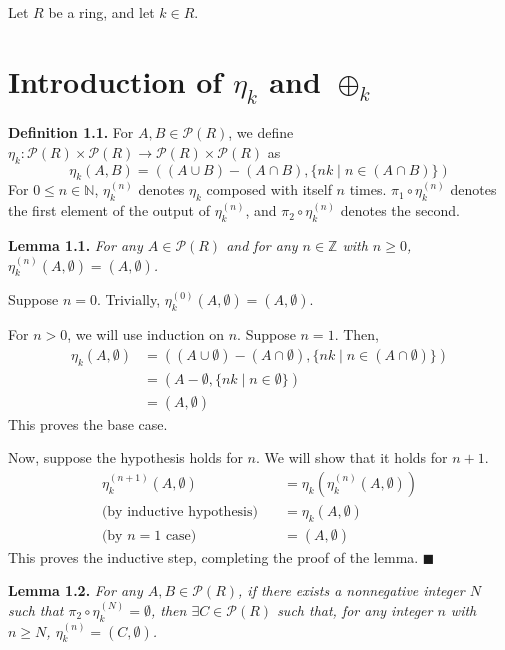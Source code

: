 \documentclass{article}
\newcommand{\zee}{\mathbb{Z}}
\newcommand{\N}{\mathbb{N}}
\begin{document}
Let $R$ be a ring, and let $k \in R$.

\section{Introduction of $\eta_k$ and $\oplus_k$}

\textbf{Definition 1.1.} For $A, B \in \mathcal{P}(R)$, we define
$\eta_k: \mathcal{P}(R) \times \mathcal{P}(R)
\rightarrow \mathcal{P}(R) \times \mathcal{P}(R)$ as
\[\eta_k(A, B) = ((A \cup B) - (A \cap B), \{nk \mid n \in (A \cap B)\})\]
For $0 \leq n \in \N$, $\eta_k^{(n)}$ denotes $\eta_k$ composed
with itself $n$ times. $\pi_1 \circ \eta_k^{(n)}$ denotes the first
element of the output of $\eta_k^{(n)}$, and $\pi_2 \circ \eta_k^{(n)}$
denotes the second.

\textbf{Lemma 1.1.} \textit{
    For any $A \in \mathcal{P}(R)$ and for any $n \in \zee$
    with $n \geq 0$,
    $\eta_k^{(n)}(A, \emptyset) = (A, \emptyset)$.
}

Suppose $n = 0$. Trivially,
$\eta_k^{(0)}(A, \emptyset) = (A, \emptyset)$.

For $n > 0$, we will use induction on $n$.
Suppose $n = 1$. Then,
\[\begin{split}
    \eta_k(A, \emptyset)
    &= ((A \cup \emptyset) - (A \cap \emptyset),
    \{nk \mid n \in (A \cap \emptyset)\}) \\
    &= (A - \emptyset, \{nk \mid n \in \emptyset\}) \\
    &= (A, \emptyset)
\end{split}\]
This proves the base case.

Now, suppose the hypothesis holds
for $n$. We will show that it holds for $n+1$.
\[\begin{split}
    \eta_k^{(n+1)}(A, \emptyset)
    &= \eta_k(\eta_k^{(n)}(A, \emptyset)) \\
    \text{(by inductive hypothesis)}\quad
    &= \eta_k(A, \emptyset) \\
    \text{(by $n=1$ case)}\quad
    &= (A, \emptyset)
\end{split}\]
This proves the inductive step, completing the proof of the
lemma. $\blacksquare$

\textbf{Lemma 1.2.} \textit{
    For any $A, B \in \mathcal{P}(R)$, if there exists a
    nonnegative integer $N$ such that
    $\pi_2 \circ \eta_k^{(N)} = \emptyset$,
    then $\exists C \in \mathcal{P}(R)$ such that,
    for any integer $n$ with $n \geq N$,
    $\eta_k^{(n)} = (C, \emptyset)$.
}
\end{document}
